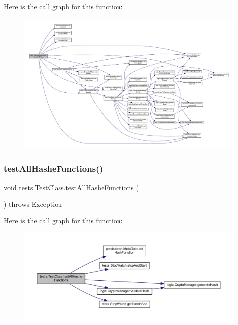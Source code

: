 Here is the call graph for this function\+:\nopagebreak
\begin{figure}[H]
\begin{center}
\leavevmode
\includegraphics[width=350pt]{classtests_1_1_test_class_a85be535c071d279d8d7bc1a40201dcff_cgraph}
\end{center}
\end{figure}
\mbox{\label{classtests_1_1_test_class_a4f4c0d8502a8a3b322a44e20a5f9cdce}} 
\subsubsection{\texorpdfstring{test\+All\+Hashe\+Functions()}{testAllHasheFunctions()}}
{\footnotesize\ttfamily void tests.\+Test\+Class.\+test\+All\+Hashe\+Functions (\begin{DoxyParamCaption}{ }\end{DoxyParamCaption}) throws Exception}

Here is the call graph for this function\+:\nopagebreak
\begin{figure}[H]
\begin{center}
\leavevmode
\includegraphics[width=350pt]{classtests_1_1_test_class_a4f4c0d8502a8a3b322a44e20a5f9cdce_cgraph}
\end{center}
\end{figure}
\mbox{\label{classtests_1_1_test_class_a8bf4e8d943fa1d61fbaa615dcefeca69}} 
